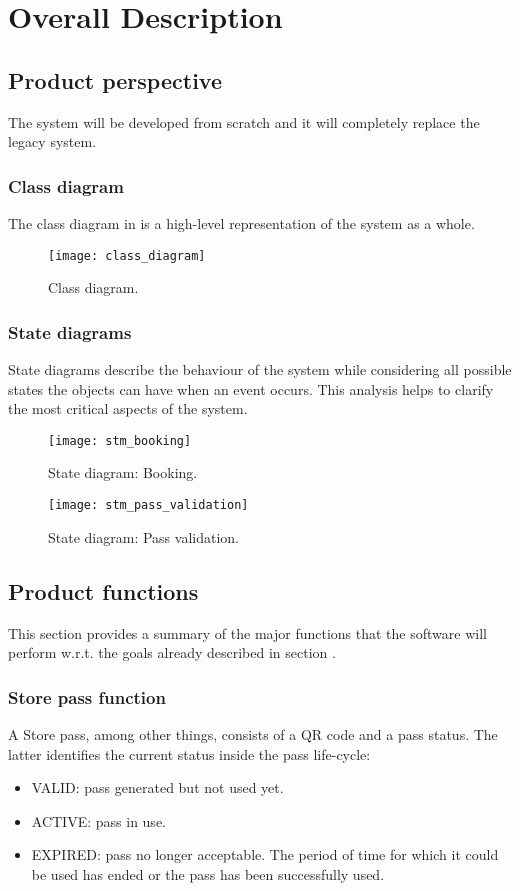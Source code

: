 \chapter{Overall Description}

\section{Product perspective}

The system will be developed from scratch and it will completely replace the legacy system.
\subsection{Class diagram}
The class diagram in  is a high-level representation of the system as a whole.

\begin{figure}[H]
	\centering
	\texttt{[image: class\_diagram]}
	\caption{Class diagram.}
	\label{fig:class_diagram}
\end{figure}


\subsection{State diagrams}
State diagrams describe the behaviour of the system while considering all possible states the objects can have when an event occurs. This analysis helps to clarify the most critical aspects of the system.

\begin{figure}[H]
	\centering
	\texttt{[image: stm\_booking]}
	\caption{State diagram: Booking.}
\end{figure}

\begin{figure}[H]
	\centering
	\texttt{[image: stm\_pass\_validation]}
	\caption{State diagram: Pass validation.}
\end{figure}


\section{Product functions}\label{desc:prodFunc}
This section provides a summary of the major functions that the software will perform w.r.t. the goals already described in section .

\subsection{Store pass function}
	A Store pass, among other things, consists of a QR code and a pass status. The latter identifies the current status inside the pass life-cycle:
	\begin{itemize}
		\item VALID: pass generated but not used yet.
		\item ACTIVE: pass in use.
		\item EXPIRED: pass no longer acceptable. The period of time for which it could be used has ended or the pass has been successfully used.
	\end{itemize}


